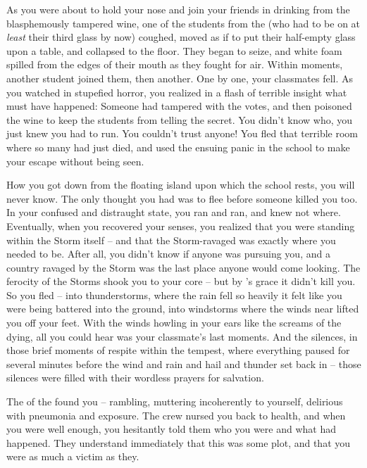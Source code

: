 \documentclass[char]{GL2020}
\begin{document}
As you were about to hold your nose and join your friends in drinking from the blasphemously tampered wine, one of the students from the \pFarm{} (who had to be on at \emph{least} their third glass by now) coughed, moved as if to put their half-empty glass upon a table, and collapsed to the floor. They began to seize, and white foam spilled from the edges of their mouth as they fought for air. Within moments, another student joined them, then another. One by one, your classmates fell. As you watched in stupefied horror, you realized in a flash of terrible insight what must have happened: Someone had tampered with the votes, and then poisoned the wine to keep the students from telling the secret. You didn't know who, you just knew you had to run. You couldn't trust anyone! You fled that terrible room where so many had just died, and used the ensuing panic in the school to make your escape without being seen.

How you got down from the floating island upon which the school rests, you will never know. The only thought you had was to flee before someone killed you too. In your confused and distraught state, you ran and ran, and knew not where. Eventually, when you recovered your senses, you realized that you were standing within the Storm itself -- and that the Storm-ravaged \pShip{} was exactly where you needed to be. After all, you didn't know if anyone was pursuing you, and a country ravaged by the Storm was the last place anyone would come looking. The ferocity of the Storms shook you to your core -- but by \cFarmGod{}'s grace it didn't kill you. So you fled -- into thunderstorms, where the rain fell so heavily it felt like you were being battered into the ground, into windstorms where the winds near lifted you off your feet. With the winds howling in your ears like the screams of the dying, all you could hear was your classmate's last moments. And the silences, in those brief moments of respite within the tempest, where everything paused for several minutes before the wind and rain and hail and thunder set back in -- those silences were filled with their wordless prayers for salvation.

The \cSaviourFleet{\full} of the \pShip{} found you -- rambling, muttering incoherently to yourself, delirious with pneumonia and exposure. The crew nursed you back to health, and when you were well enough, you hesitantly told them who you were and what had happened. They understand immediately that this was some plot, and that you were as much a victim as they.
\end{document}
